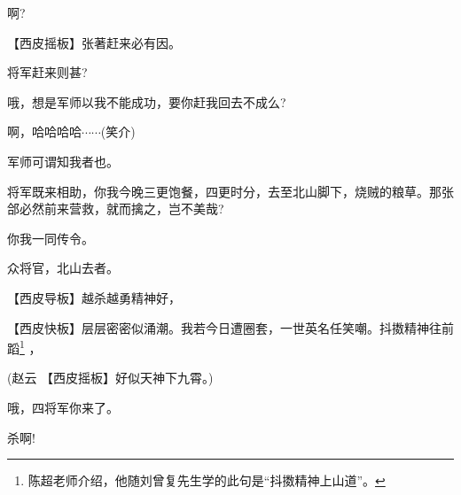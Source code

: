 {啊?

【{\akai 西皮摇板}】张著赶来必有因。

将军赶来则甚?

哦，想是军师以我不能成功，要你赶我回去不成么?

啊，哈哈哈哈$\cdots${}$\cdots${}(笑介)

军师可谓知我者也。

将军既来相助，你我今晚三更饱餐，四更时分，去至北山脚下，烧贼的粮草。那张郃必然前来营救，就而擒之，岂不美哉?

你我一同传令。

众将官，北山去者。

\vspace{5pt}

【{\akai 西皮导板}】越杀越勇精神好，

【{\akai 西皮快板}】层层密密似涌潮。我若今日遭圈套，一世英名任笑嘲。抖擞精神往前蹈\footnote{陈超老师介绍，他随刘曾复先生学的此句是``抖擞精神上山道''。}%
，

(赵云\hspace{25pt} 【{\akai 西皮摇板}】好似天神下九霄。)

哦，四将军你来了。

杀啊!
}
